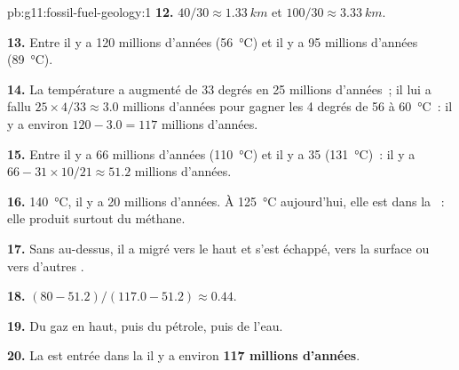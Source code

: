 \begin{solution}{pb:g11:fossil-fuel-geology:1}
\textbf{12.} $40/30 \approx \qty{1.33}{km}$ et $100/30 \approx
\qty{3.33}{km}$.

\textbf{13.} Entre il y a 120 millions d'années (\qty{56}{\degreeCelsius})
et il y a 95 millions d'années (\qty{89}{\degreeCelsius}).

\textbf{14.} La température a augmenté de 33 degrés en 25 millions
d'années~; il lui a fallu $25 \times 4/33 \approx 3.0$ millions d'années
pour gagner les 4 degrés de \num{56} à \qty{60}{\degreeCelsius}~: il y a
environ $120 - 3.0 = 117$ millions d'années.

\textbf{15.} Entre il y a 66 millions d'années (\qty{110}{\degreeCelsius})
et il y a 35 (\qty{131}{\degreeCelsius})~: il y a
$66 - 31 \times 10/21 \approx 51.2$ millions d'années.

\textbf{16.} \qty{140}{\degreeCelsius}, il y a 20 millions d'années. À
\qty{125}{\degreeCelsius} aujourd'hui, elle est dans la ~:
elle produit surtout du méthane.

\textbf{17.} Sans  au-dessus, il a migré vers le haut et s'est
échappé, vers la surface ou vers d'autres .

\textbf{18.} $(80 - 51.2)/(117.0 - 51.2) \approx 0.44$.

\textbf{19.} Du gaz en haut, puis du pétrole, puis de l'eau.

\textbf{20.} La  est entrée dans la  il y a
environ \textbf{117 millions d'années}.
\end{solution}
